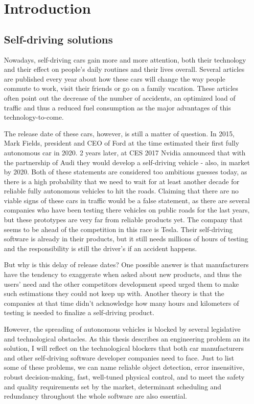 \chapter{Introduction}
\label{chap:introduction}

\section{Self-driving solutions}
Nowadays, self-driving cars gain more and more attention, both their technology and their effect on people's daily routines and their lives overall. Several articles are published every year about how these cars will change the way people commute to work, visit their friends or go on a family vacation. These articles often point out the decrease of the number of accidents, an optimized load of traffic and thus a reduced fuel consumption as the major advantages of this technology-to-come.

The release date of these cars, however, is still a matter of question. In 2015, Mark Fields, president and CEO of Ford at the time estimated their first fully autonomous car in 2020. 2 years later, at CES 2017 Nvidia announced that with the partnership of Audi they would develop a self-driving vehicle - also, in market by 2020. Both of these statements are considered too ambitious guesses today, as there is a high probability that we need to wait for at least another decade for reliable fully autonomous vehicles to hit the roads. Claiming that there are no viable signs of these cars in traffic would be a false statement, as there are several companies who have been testing there vehicles on public roads for the last years, but these prototypes are very far from reliable products yet. The company that seems to be ahead of the competition in this race is Tesla. Their self-driving software is already in their products, but it still needs millions of hours of testing and the responsibility is still the driver's if an accident happens.

But why is this delay of release dates? One possible answer is that manufacturers have the tendency to exaggerate when asked about new products, and thus the users' need and the other competitors development speed urged them to make such estimations they could not keep up with. Another theory is that the companies at that time didn't acknowledge how many hours and kilometers of testing is needed to finalize a self-driving product.

However, the spreading of autonomous vehicles is blocked by several legislative and technological obstacles. As this thesis describes an engineering problem an its solution, I will reflect on the technological blockers that both car manufacturers and other self-driving software developer companies need to face. Just to list some of these problems, we can name reliable object detection, error insensitive, robust decision-making, fast, well-tuned physical control, and to meet the safety and quality requirements set by the market, determinant scheduling and redundancy throughout the whole software are also essential.

